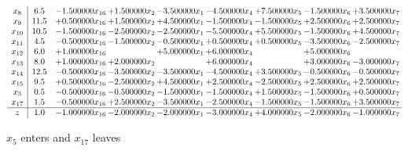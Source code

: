 \documentclass[10pt]{article}
\begin{document}
 \[\begin{array}{c| c c@{\hskip 2pt} c@{\hskip 2pt} c@{\hskip 2pt} c@{\hskip 2pt} c@{\hskip 2pt} c@{\hskip 2pt} c@{\hskip 2pt} }
 x_{8}   &  6.5 & -1.500000 x_{16} & + 1.500000 x_{2} & -3.500000 x_{1} & -4.500000 x_{4} & + 7.500000 x_{5} & -1.500000 x_{6} & + 3.500000 x_{7}\\
 x_{9}   &  11.5 & + 0.500000 x_{16} & + 1.500000 x_{2} & + 4.500000 x_{1} & -1.500000 x_{4} & -1.500000 x_{5} & + 2.500000 x_{6} & + 2.500000 x_{7}\\
 x_{10}   &  10.5 & -1.500000 x_{16} & -2.500000 x_{2} & -2.500000 x_{1} & -5.500000 x_{4} & + 5.500000 x_{5} & -1.500000 x_{6} & + 4.500000 x_{7}\\
 x_{11}   &  4.5 & -0.500000 x_{16} & -1.500000 x_{2} & -0.500000 x_{1} & + 0.500000 x_{4} & + 0.500000 x_{5} & -3.500000 x_{6} & -2.500000 x_{7}\\
 x_{12}   &  6.0 & + 1.000000 x_{16} &   & + 5.000000 x_{1} & + 6.000000 x_{4} &   & + 5.000000 x_{6} &   \\
 x_{13}   &  8.0 & + 1.000000 x_{16} & + 2.000000 x_{2} &   & + 6.000000 x_{4} &   & + 3.000000 x_{6} & -3.000000 x_{7}\\
 x_{14}   &  12.5 & -0.500000 x_{16} & -3.500000 x_{2} & -3.500000 x_{1} & -4.500000 x_{4} & + 3.500000 x_{5} & -0.500000 x_{6} & -0.500000 x_{7}\\
 x_{15}   &  9.5 & + 0.500000 x_{16} & -2.500000 x_{2} & + 4.500000 x_{1} & + 2.500000 x_{4} & -2.500000 x_{5} & + 2.500000 x_{6} & + 2.500000 x_{7}\\
 x_{3}   &  0.5 & -0.500000 x_{16} & -0.500000 x_{2} & -1.500000 x_{1} & -1.500000 x_{4} & + 1.500000 x_{5} & -1.500000 x_{6} & + 0.500000 x_{7}\\
 x_{17}   &  1.5 & -0.500000 x_{16} & + 2.500000 x_{2} & -3.500000 x_{1} & -2.500000 x_{4} & -1.500000 x_{5} & -1.500000 x_{6} & + 3.500000 x_{7}\\
\hline
z    &  1.0 & -1.000000 x_{16} & -2.000000 x_{2} & -2.000000 x_{1} & -3.000000 x_{4} & + 4.000000 x_{5} & -2.000000 x_{6} & -1.000000 x_{7}\\
\end{array}\]


 $ x_{5} $ enters and $ x_{17} $ leaves 
\end{document}
